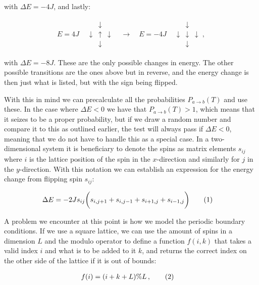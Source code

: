 \documentclass[reprint,english,notitlepage]{revtex4-1}  %
\newcommand\numberthis{\addtocounter{equation}{1}\tag{\theequation}}
\begin{document}
with $\Delta E = -4J$, and lastly:

\begin{align*}
E = 4J \quad \begin{array}{ccc}
& \downarrow & \\
\downarrow & \uparrow & \downarrow \\
& \downarrow &
\end{array} \quad \to \quad E = -4J \quad \begin{array}{ccc}
& \downarrow & \\
\downarrow & \downarrow & \downarrow \\
& \downarrow &
\end{array} \, ,
\end{align*}

with $\Delta E = -8J$. These are the only possible changes in energy. The other possible transitions are the ones above but in reverse, and the energy change is then just what is listed, but with the sign being flipped. 

With this in mind we can precalculate all the probabilities $P_{a \to b} (T)$ and use these. In the case where $\Delta E < 0$ we have that $P_{a\to b} (T) > 1$, which means that it seizes to be a proper probability, but if we draw a random number and compare it to this as outlined earlier, the test will always pass if $\Delta E < 0$, meaning that we do not have to handle this as a special case. In a two-dimensional system it is beneficiary to denote the spins as matrix elements $s_{ij}$ where $i$ is the lattice position of the spin in the $x$-direction and similarly for $j$ in the $y$-direction. With this notation we can establish an expression for the energy change from flipping spin $s_{ij}$:

\begin{align*}
\Delta E &= -2J s_{ij} \bigg( s_{i,j+1} + s_{i,j-1} + s_{i+1,j} + s_{i-1,j} \bigg) \numberthis \label{eq:singleflip_energy_change}
\end{align*}

A problem we encounter at this point is how we model the periodic boundary conditions. If we use a square lattice, we can use the amount of spins in a dimension $L$ and the modulo operator to define a function $f(i,k)$ that takes a valid index $i$ and what is to be added to it $k$, and returns the correct index on the other side of the lattice if it is out of bounds:

\begin{align*}
f(i) &= (i+k+L)\%L \, , \numberthis \label{eq:periodic}
\end{align*}
\end{document}

